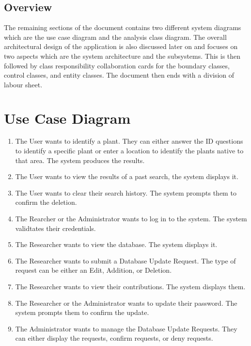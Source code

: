 \documentclass[]{article}
\begin{document}
\subsection{Overview}
\label{sub:overview}
The remaining sections of the document contains two different system diagrams which are the use case diagram and the analysis class diagram. The overall architectural design of the application is also discussed later on and focuses on two aspects which are the system architecture and the subsystems. This is then followed by class responsibility collaboration cards for the boundary classes, control classes, and entity classes. The document then ends with a division of labour sheet.



\section{Use Case Diagram}
\label{sec:use_case_diagram}
\begin{enumerate}[1.]
	\item The User wants to identify a plant. They can either answer the ID questions to identify a specific plant or enter a location to identify the plants native to that area. The system produces the results.
	\item The User wants to view the results of a past search, the system displays it.
	\item The User wants to clear their search history. The system prompts them to confirm the deletion.
	\item The Rearcher or the Administrator wants to log in to the system. The system validtates their credentials.
	\item The Researcher wants to view the database. The system displays it.
	\item The Researcher wants to submit a Database Update Request. The type of request can be either an Edit, Addition, or Deletion.
	\item The Researcher wants to view their contributions. The system displays them.
	\item The Researcher or the Administrator wants to update their password. The system prompts them to confirm the update.
	\item The Administrator wants to manage the Database Update Requests. They can either display the requests, confirm requests, or deny requests.
\end{enumerate}
\end{document}
